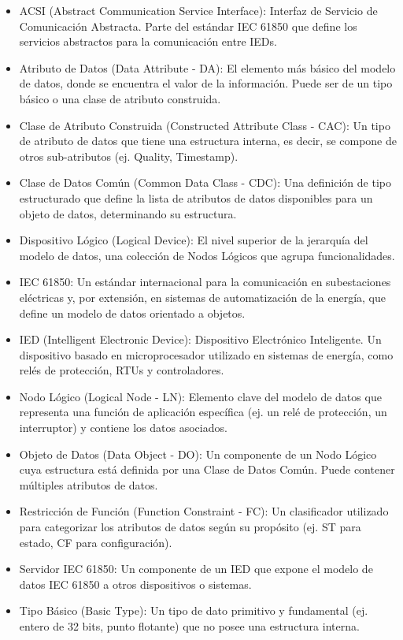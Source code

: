 \documentclass[a5paper]{book}%
\begin{document}
\begin{itemize}
\item ACSI (Abstract Communication Service Interface): Interfaz de Servicio de Comunicación Abstracta. Parte del estándar IEC 61850 que define los servicios abstractos para la comunicación entre IEDs.
\item Atributo de Datos (Data Attribute - DA): El elemento más básico del modelo de datos, donde se encuentra el valor de la información. Puede ser de un tipo básico o una clase de atributo construida.
\item Clase de Atributo Construida (Constructed Attribute Class - CAC): Un tipo de atributo de datos que tiene una estructura interna, es decir, se compone de otros sub-atributos (ej. Quality, Timestamp).
\item Clase de Datos Común (Common Data Class - CDC): Una definición de tipo estructurado que define la lista de atributos de datos disponibles para un objeto de datos, determinando su estructura.
\item Dispositivo Lógico (Logical Device): El nivel superior de la jerarquía del modelo de datos, una colección de Nodos Lógicos que agrupa funcionalidades.
\item IEC 61850: Un estándar internacional para la comunicación en subestaciones eléctricas y, por extensión, en sistemas de automatización de la energía, que define un modelo de datos orientado a objetos.
\item IED (Intelligent Electronic Device): Dispositivo Electrónico Inteligente. Un dispositivo basado en microprocesador utilizado en sistemas de energía, como relés de protección, RTUs y controladores.
\item Nodo Lógico (Logical Node - LN): Elemento clave del modelo de datos que representa una función de aplicación específica (ej. un relé de protección, un interruptor) y contiene los datos asociados.
  
\item Objeto de Datos (Data Object - DO): Un componente de un Nodo Lógico cuya estructura está definida por una Clase de Datos Común. Puede contener múltiples atributos de datos.
  \item Restricción de Función (Function Constraint - FC): Un clasificador utilizado para categorizar los atributos de datos según su propósito (ej. ST para estado, CF para configuración).
  \item Servidor IEC 61850: Un componente de un IED que expone el modelo de datos IEC 61850 a otros dispositivos o sistemas.
  \item Tipo Básico (Basic Type): Un tipo de dato primitivo y fundamental (ej. entero de 32 bits, punto flotante) que no posee una estructura interna.
\end{itemize}
\end{document}
